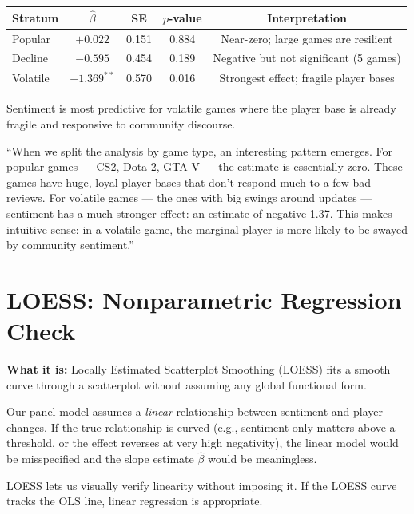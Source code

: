 \documentclass[11pt, letterpaper]{article}
\theoremstyle{definition}
\begin{document}
\begin{resultbox}
\begin{center}
\begin{tabular}{lcccc}
\toprule
\textbf{Stratum} & $\hat{\beta}$ & SE & $p$-value & Interpretation \\
\midrule
Popular  & $+0.022$ & 0.151 & 0.884 & Near-zero; large games are resilient \\
Decline  & $-0.595$ & 0.454 & 0.189 & Negative but not significant (5 games) \\
Volatile & $-1.369^{**}$ & 0.570 & 0.016 & Strongest effect; fragile player bases \\
\bottomrule
\end{tabular}
\end{center}
Sentiment is most predictive for volatile games where the player base is already fragile and responsive to community discourse.
\end{resultbox}

\begin{speakerbox}
``When we split the analysis by game type, an interesting pattern emerges.
For popular games --- CS2, Dota 2, GTA V --- the estimate is essentially zero.
These games have huge, loyal player bases that don't respond much to a few bad reviews.
For volatile games --- the ones with big swings around updates --- sentiment has a much stronger effect: an estimate of negative 1.37.
This makes intuitive sense: in a volatile game, the marginal player is more likely to be swayed by community sentiment.''
\end{speakerbox}

\section{LOESS: Nonparametric Regression Check}

\textbf{What it is:} Locally Estimated Scatterplot Smoothing (LOESS) fits a smooth curve through a scatterplot without assuming any global functional form.

\begin{whybox}
Our panel model assumes a \emph{linear} relationship between sentiment and player changes.
If the true relationship is curved (e.g., sentiment only matters above a threshold, or the effect reverses at very high negativity), the linear model would be misspecified and the slope estimate $\hat{\beta}$ would be meaningless.

LOESS lets us visually verify linearity without imposing it.
If the LOESS curve tracks the OLS line, linear regression is appropriate.
\end{whybox}
\end{document}
